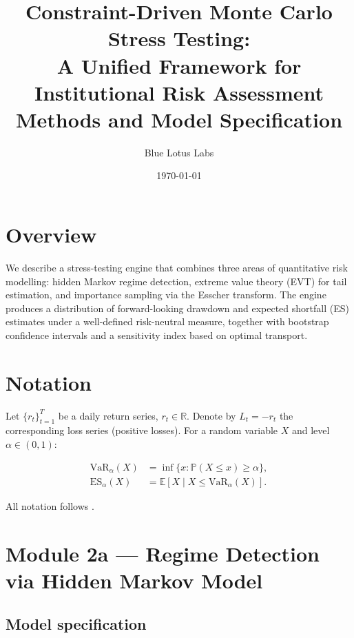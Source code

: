 \documentclass[12pt]{article}
\title{\textbf{Constraint-Driven Monte Carlo Stress Testing:\\
A Unified Framework for Institutional Risk Assessment}\\[0.5em]
\large Methods and Model Specification}
\author{Blue Lotus Labs}
\date{\today}
\newcommand{\E}{\mathbb{E}}
\newcommand{\P}{\mathbb{P}}
\newcommand{\R}{\mathbb{R}}
\begin{document}
\maketitle

\section{Overview}

We describe a stress-testing engine that combines three areas of
quantitative risk modelling: hidden Markov regime detection,
extreme value theory (EVT) for tail estimation, and importance
sampling via the Esscher transform.  The engine produces a
distribution of forward-looking drawdown and expected shortfall
(ES) estimates under a well-defined risk-neutral measure, together
with bootstrap confidence intervals and a sensitivity index based
on optimal transport.

\section{Notation}

Let $\{r_t\}_{t=1}^{T}$ be a daily return series, $r_t \in \R$.
Denote by $L_t = -r_t$ the corresponding loss series (positive
losses).  For a random variable $X$ and level $\alpha \in (0,1)$:

\begin{align}
  \text{VaR}_\alpha(X) &= \inf\{x : \P(X \leq x) \geq \alpha\}, \\
  \text{ES}_\alpha(X)  &= \E\!\left[X \mid X \leq \text{VaR}_\alpha(X)\right].
\end{align}

All notation follows \citet{McNeilFreyEmbrechts2015}.

\section{Module 2a — Regime Detection via Hidden Markov Model}

\subsection{Model specification}
\end{document}
